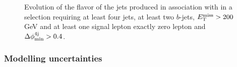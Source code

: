 \begin{figure}[htb]
\centering 
{}
\caption{Evolution of the flavor of the jets produced in association with \ttbar in a selection requiring at least four jets, at least two $b$-jets, $E_{\rm T}^{\mathrm{miss}}>200$ GeV and  at least one signal lepton  exactly zero lepton and $\Delta\phi_{\rm{min}}^{4{\rm{j}}} > 0.4$.}\label{fig:ttbar_HF_bjets}
\end{figure}


\subsubsection*{Modelling uncertainties}

